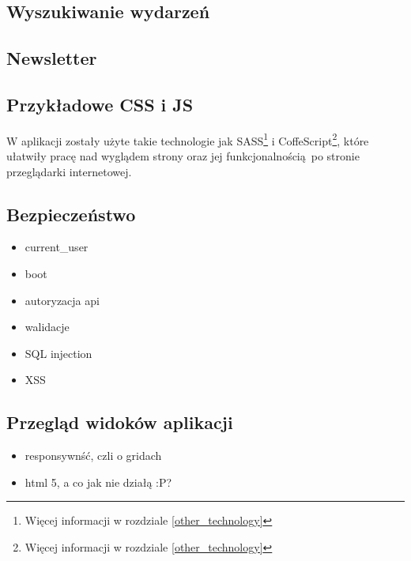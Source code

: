    

    \subsection{Wyszukiwanie wydarzeń}
    \subsection{Newsletter}
    \subsection{Przykładowe CSS i JS}
    W aplikacji zostały użyte takie technologie jak SASS\footnote{Więcej informacji w rozdziale \ref{other_technology}} i CoffeScript\footnote{Więcej informacji w rozdziale \ref{other_technology}}, które ułatwiły pracę nad wyglądem strony oraz jej funkcjonalnością po stronie przeglądarki internetowej.
    \subsection{Bezpieczeństwo}
      \begin{itemize}
        \item current\_user
        \item boot
        \item autoryzacja api
        \item walidacje
        \item SQL injection
        \item XSS
      \end{itemize}
    \subsection{Przegląd widoków aplikacji}
      \begin{itemize}
        \item responsywnść, czli o gridach
        \item html 5, a co jak nie działą :P?
      \end{itemize}

